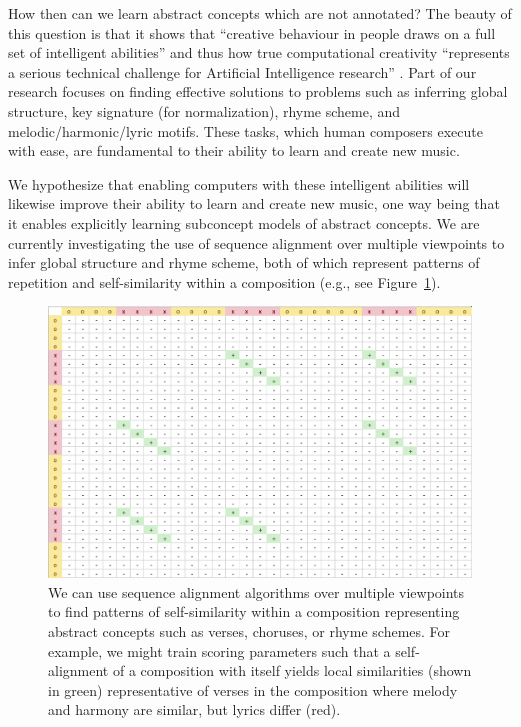\documentclass[letterpaper]{article}
\begin{document}
How then can we learn abstract concepts which are not annotated? The beauty of this question is that it shows that ``creative behaviour in people draws on a full set of intelligent abilities'' and thus how true computational creativity ``represents a serious technical challenge for Artificial Intelligence research'' \cite{colton2012computational}. Part of our research focuses on finding effective solutions to problems such as inferring global structure, key signature (for normalization), rhyme scheme, and melodic/harmonic/lyric motifs. These tasks, which human composers execute with ease, are fundamental to their ability to learn and create new music. 

We hypothesize that enabling computers with these intelligent abilities will likewise improve their ability to learn and create new music, one way being that it enables explicitly learning subconcept models of abstract concepts. We are currently investigating the use of sequence alignment over multiple viewpoints to infer global structure and rhyme scheme, both of which represent patterns of repetition and self-similarity within a composition (e.g., see Figure~\ref{fig:verse_alignment}).

\begin{figure}[t]
	\centering
	\includegraphics[width=\linewidth]{verse_alignment}
	\caption{\label{fig:verse_alignment} We can use sequence alignment algorithms over multiple viewpoints to find patterns of self-similarity within a composition representing abstract concepts such as verses, choruses, or rhyme schemes. For example, we might train scoring parameters such that a self-alignment of a composition with itself yields local similarities (shown in green) representative of verses in the composition where melody and harmony are similar, but lyrics differ (red).}
\end{figure}
\end{document}
